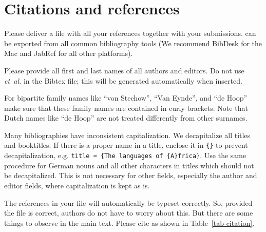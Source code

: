 {\section{Citations and references}
\label{sec-references-authors}

Please deliver a \bibtex file with all your references together with your submissions. 
\bibtex can be exported from all common bibliography tools (We recommend BibDesk for the Mac and JabRef for all other platforms). 

Please provide all first and last names of all authors and editors. Do not use {\em et~al.}  in the Bibtex file; this will be generated automatically when inserted.

For bipartite family names like ``von Stechow'', ``Van Eynde'', and ``de Hoop'' make sure that these
family names are contained in curly brackets.
 Note that Dutch names like ``de Hoop'' are not treated differently from other surnames.

Many bibliographies have inconsistent capitalization. We decapitalize all titles and booktitles. If there is a proper name in a title, enclose it in \verb+{}+ to prevent decapitalization, e.g. \verb+title = {The languages of {A}frica}+. Use the same procedure for German nouns and all other characters in titles which should not be decapitalized. This is not necessary for other fields, especially the author and editor fields, where capitalization is kept as is.

The references in your \bibtex file will automatically be typeset correctly. So, provided the
\bibtex file is correct, authors do not have to worry about this. But there are some things to
observe in the main text. Please cite as shown in Table~\ref{tab-citation}.

}
